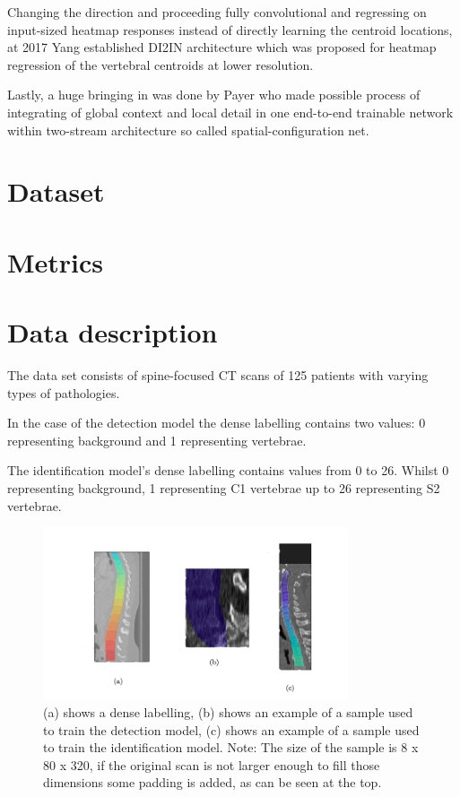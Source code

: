 Changing the direction and proceeding fully convolutional and regressing on input-sized heatmap responses instead of directly learning the centroid locations, at 2017 Yang established DI2IN architecture \cite{Yang2017} which was proposed for heatmap regression of the vertebral centroids at lower resolution. 

Lastly, a huge bringing in was done by Payer \cite{Payer2019} who made possible process of integrating of global context and local detail in one end-to-end trainable network 
within two-stream architecture so called spatial-configuration net. 

\section{Dataset}
\section{Metrics}


\section{Data description}
The data set consists of spine-focused CT scans of 125 patients with varying types of pathologies. 

In the case of the detection model the dense labelling contains two values: 0 representing background and 1 representing vertebrae. 

The identification model’s dense labelling contains values from 0 to 26. Whilst 0 representing background, 1 representing C1 vertebrae up to 26 representing S2 vertebrae.

\begin{figure}[h]
    \centering \includegraphics[width=9cm]{images/labeled_data.png}
    \caption {(a) shows a dense labelling, (b) shows an example of a sample used to train the detection model, (c) shows an example of a sample used to train the identification model. Note: The size of the sample is 8 x 80 x 320, if the original scan is not larger enough to fill those dimensions some padding is added, as can be seen at the top.}
    \label{fig:labeled_data}
\end{figure}
